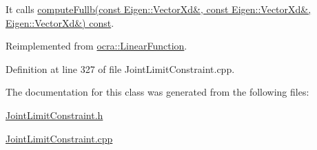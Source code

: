 It calls \hyperlink{classocra_1_1JointLimitFunction_a254ef5b5095410a802976c95f04fe0a4}{compute\+Fullb(const Eigen\+::\+Vector\+Xd\&, const Eigen\+::\+Vector\+Xd\&, Eigen\+::\+Vector\+Xd\&) const}. 

Reimplemented from \hyperlink{classocra_1_1LinearFunction_a546454cd8d0909f99433ffc0e700c9e3}{ocra\+::\+Linear\+Function}.



Definition at line 327 of file Joint\+Limit\+Constraint.\+cpp.



The documentation for this class was generated from the following files\+:\begin{DoxyCompactItemize}
\item 
\hyperlink{JointLimitConstraint_8h}{Joint\+Limit\+Constraint.\+h}\item 
\hyperlink{JointLimitConstraint_8cpp}{Joint\+Limit\+Constraint.\+cpp}\end{DoxyCompactItemize}
